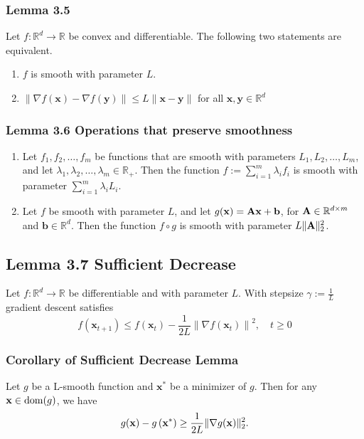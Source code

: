 \subsubsection*{Lemma 3.5}
Let $f: \mathbb{R}^{d} \rightarrow \mathbb{R}$ be convex and differentiable. The following two statements are equivalent.
\begin{enumerate}[label = (\arabic*), leftmargin=*]
    \item $f$ is smooth with parameter $L$.
    \item $\|\nabla f(\mathbf{x})-\nabla f(\mathbf{y})\| \leq L\|\mathbf{x}-\mathbf{y}\|$ for all $\mathbf{x}, \mathbf{y} \in \mathbb{R}^{d}$
\end{enumerate}

\subsubsection*{Lemma 3.6 Operations that preserve smoothness}
\begin{enumerate}[label = (\arabic*), leftmargin=*]
    \item Let $f_{1}, f_{2}, \ldots, f_{m}$ be functions that are smooth with parameters $L_{1}, L_{2}, \ldots, L_{m}$, and let $\lambda_{1}, \lambda_{2}, \ldots, \lambda_{m} \in \mathbb{R}_{+}$. Then the function $f:=\sum_{i=1}^{m} \lambda_{i} f_{i}$ is smooth with parameter $\sum_{i=1}^{m} \lambda_{i} L_{i}$.
    \item Let $f$ be smooth with parameter $L$, and let $g(\mathbf{x})=\boldsymbol{\mathbf{A}} \mathbf{x}+\mathbf{b}$, for $\boldsymbol{\mathbf{A}} \in \mathbb{R}^{d \times m}$ and $\mathbf{b} \in \mathbb{R}^{d}$. Then the function $f \circ g$ is smooth with parameter $L\|\boldsymbol{\mathbf{A}}\|^{2}_2$.
\end{enumerate}


\subsection*{Lemma 3.7 Sufficient Decrease}
Let $f: \mathbb{R}^{d} \rightarrow \mathbb{R}$ be differentiable and  with parameter $L$. With stepsize $\gamma:=\frac{1}{L}$ gradient descent satisfies
$$f\left(\mathbf{x}_{t+1}\right) \leq f\left(\mathbf{x}_{t}\right)-\frac{1}{2 L}\left\|\nabla f\left(\mathbf{x}_{t}\right)\right\|^{2}, \quad t \geq 0$$



\subsubsection*{Corollary of Sufficient Decrease Lemma}
Let ${g}$ be a L-smooth function and $\mathbf{x}^{*}$ be a minimizer of ${g}$. Then for any $\operatorname{\boldsymbol{\mathbf{x}}} \in \operatorname{dom}(g)$, we have
$$
g(\operatorname{\boldsymbol{\mathbf{x}}})-g\left(\operatorname{\boldsymbol{\mathbf{x}}}^{*}\right) \geq \frac{1}{2 L}\|\nabla g(\operatorname{\boldsymbol{\mathbf{x}}})\|_{2}^{2} .
$$

